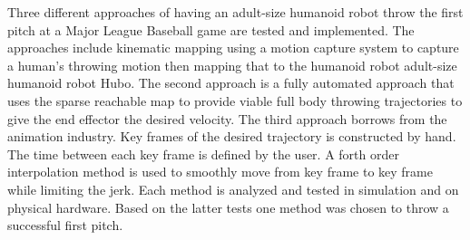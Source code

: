 Three different approaches of having an adult-size humanoid robot throw the first pitch at a Major League Baseball game are tested and implemented.  The approaches include kinematic mapping using a motion capture system to capture a human's throwing motion then mapping that to the humanoid robot adult-size humanoid robot Hubo.  The second approach is a fully automated approach that uses the sparse reachable map to provide viable full body throwing trajectories to give the end effector the desired velocity.  The third approach borrows from the animation industry.  Key frames of the desired trajectory is constructed by hand.  The time between each key frame is defined by the user.  A forth order interpolation method is used to smoothly move from key frame to key frame while limiting the jerk.  Each method is analyzed and tested in simulation and on physical hardware.  Based on the latter tests one method was chosen to throw a successful first pitch.